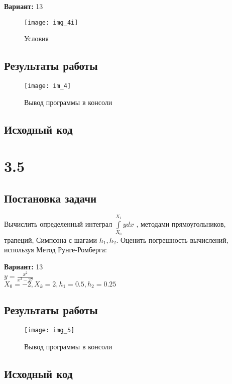 {\bfseries Вариант:} 13

\begin{figure}[h!]
\centering
\texttt{[image: img\_4i]}
\caption{Условия}
\end{figure}

\subsection{Результаты работы}
\begin{figure}[h!]
\centering
\texttt{[image: im\_4]}
\caption{Вывод программы в консоли}
\end{figure}
\pagebreak

\subsection{Исходный код}



\pagebreak
\section* {3.5}

\subsection{Постановка задачи}
Вычислить определенный интеграл $\int\limits_{X_0}^{X_1} y dx$  , методами прямоугольников, трапеций, Симпсона с шагами $h_1,h_2$. Оценить погрешность вычислений, используя  Метод Рунге-Ромберга: 

{\bfseries Вариант:} 13\\
$y= \frac{x^2}{x^3-27}$\\
$X_0=-2, X_k=2, h_1=0.5, h_2=0.25$

\subsection{Результаты работы}
\begin{figure}[h!]
\centering
\texttt{[image: img\_5]}
\caption{Вывод программы в консоли}
\end{figure}
\pagebreak


\subsection{Исходный код}



